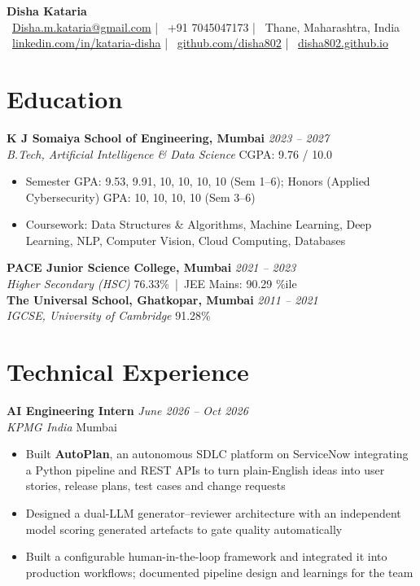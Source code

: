 \documentclass[10.5pt,a4paper]{article}
\newcommand{\entry}[4]{%
  \textbf{#1} \hfill \textit{#2}\\
  \textit{#3} \hfill #4\\[2pt]
}
\begin{document}
\begin{center}
  {\Huge \rmfamily\bfseries\color{HeadBlue} Disha Kataria}\\[4pt]
  {\small
    \faEnvelope\ \href{mailto:Disha.m.kataria@gmail.com}{Disha.m.kataria@gmail.com} \quad|\quad
    \faPhone\ +91 7045047173 \quad|\quad
    \faMapMarker*\ Thane, Maharashtra, India \\[2pt]
    \faLinkedin\ \href{https://linkedin.com/in/kataria-disha/}{linkedin.com/in/kataria-disha} \quad|\quad
    \faGithub\ \href{https://github.com/disha802}{github.com/disha802} \quad|\quad
    \faGlobe\ \href{https://disha802.github.io}{disha802.github.io}
  }
\end{center}
\vspace{-4pt}

\section*{Education}
\entry{K J Somaiya School of Engineering, Mumbai}{2023 -- 2027}
      {B.Tech, Artificial Intelligence \& Data Science}{CGPA: 9.76 / 10.0}
\begin{itemize}
  \item Semester GPA: 9.53, 9.91, 10, 10, 10, 10 (Sem 1--6); Honors (Applied Cybersecurity) GPA: 10, 10, 10, 10 (Sem 3--6)
  \item Coursework: Data Structures \& Algorithms, Machine Learning, Deep Learning, NLP, Computer Vision, Cloud Computing, Databases
\end{itemize}
\entry{PACE Junior Science College, Mumbai}{2021 -- 2023}
      {Higher Secondary (HSC)}{76.33\% \,|\, JEE Mains: 90.29 \%ile}
\entry{The Universal School, Ghatkopar, Mumbai}{2011 -- 2021}
      {IGCSE, University of Cambridge}{91.28\%}

\section*{Technical Experience}

\entry{AI Engineering Intern}{June 2026 -- Oct 2026}{KPMG India}{Mumbai}
\begin{itemize}
  \item Built \textbf{AutoPlan}, an autonomous SDLC platform on ServiceNow integrating a Python pipeline and REST APIs to turn plain-English ideas into user stories, release plans, test cases and change requests
  \item Designed a dual-LLM generator--reviewer architecture with an independent model scoring generated artefacts to gate quality automatically
  \item Built a configurable human-in-the-loop framework and integrated it into production workflows; documented pipeline design and learnings for the team
\end{itemize}
\end{document}
